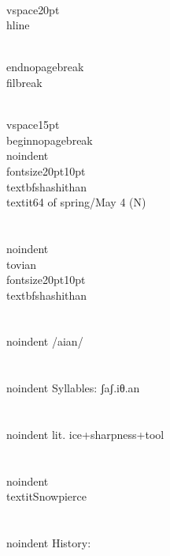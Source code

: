 \\vspace{20pt}\\hline

\\end{nopagebreak}
\\filbreak



\\vspace{15pt}
\\begin{nopagebreak}
\\noindent{\\fontsize{20pt}{10pt}\\textbf{shashithan} } \\textit{64 of spring/May 4} (N)\\\\
\\noindent {\\tovian \\fontsize{20pt}{10pt} \\textbf{shashithan} }\\\\
\\noindent /{\textesh}a{\textesh}{\textprimstress}i{\texttheta}an/\\\\
\\noindent Syllables: ʃaʃ.iθ.an\\\\
\\noindent lit. ice+sharpness+tool\\\\
\\noindent \\textit{Snowpierce}\\\\


\\noindent History:

